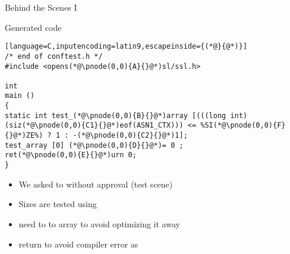 \documentclass[ngerman,xcolor={table,dvipsnames},smaller,compress,hyperref={bookmarks,colorlinks}]{beamer}%
\begin{document}
\begin{frame}[fragile]{Behind the Scenes I}
\begin{block}{Generated code}
\scriptsize
\begin{lstlisting}[language=C,inputencoding=latin9,escapeinside={(*@}{@*)}]
/* end of conftest.h */
#include <opens(*@\pnode(0,0){A}{}@*)sl/ssl.h>

int
main ()
{
static int test_(*@\pnode(0,0){B}{}@*)array [(((long int)(siz(*@\pnode(0,0){C1}{}@*)eof(ASN1_CTX))) <= %SI(*@\pnode(0,0){F}{}@*)ZE%) ? 1 : -(*@\pnode(0,0){C2}{}@*)1];
test_array [0] (*@\pnode(0,0){D}{}@*)= 0 ;
ret(*@\pnode(0,0){E}{}@*)urn 0;
}
\end{lstlisting} %
\end{block}

\begin{itemize}
\item<2-> We asked to  without approval (test scene)

\item<3-> Sizes are tested using   

\item<5-> need to  to array to avoid optimizing it away

\item<6-> return to avoid compiler error as 


\end{itemize}

\end{frame}
\end{document}
